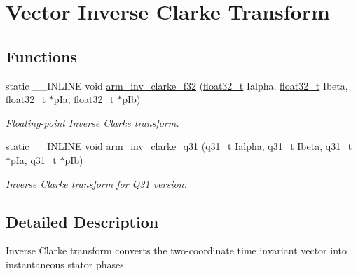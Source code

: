 \hypertarget{group__inv__clarke}{}\section{Vector Inverse Clarke Transform}
\label{group__inv__clarke}
\subsection*{Functions}
\begin{DoxyCompactItemize}
\item 
static \+\_\+\+\_\+\+I\+N\+L\+I\+NE void \hyperlink{group__inv__clarke_ga137f0396d837477b899ecae89f075a50}{arm\+\_\+inv\+\_\+clarke\+\_\+f32} (\hyperlink{arm__math_8h_a4611b605e45ab401f02cab15c5e38715}{float32\+\_\+t} Ialpha, \hyperlink{arm__math_8h_a4611b605e45ab401f02cab15c5e38715}{float32\+\_\+t} Ibeta, \hyperlink{arm__math_8h_a4611b605e45ab401f02cab15c5e38715}{float32\+\_\+t} $\ast$p\+Ia, \hyperlink{arm__math_8h_a4611b605e45ab401f02cab15c5e38715}{float32\+\_\+t} $\ast$p\+Ib)
\begin{DoxyCompactList}\small\item\em Floating-\/point Inverse Clarke transform. \end{DoxyCompactList}\item 
static \+\_\+\+\_\+\+I\+N\+L\+I\+NE void \hyperlink{group__inv__clarke_ga2d0c60f114f095a2f27442d98781ba02}{arm\+\_\+inv\+\_\+clarke\+\_\+q31} (\hyperlink{arm__math_8h_adc89a3547f5324b7b3b95adec3806bc0}{q31\+\_\+t} Ialpha, \hyperlink{arm__math_8h_adc89a3547f5324b7b3b95adec3806bc0}{q31\+\_\+t} Ibeta, \hyperlink{arm__math_8h_adc89a3547f5324b7b3b95adec3806bc0}{q31\+\_\+t} $\ast$p\+Ia, \hyperlink{arm__math_8h_adc89a3547f5324b7b3b95adec3806bc0}{q31\+\_\+t} $\ast$p\+Ib)
\begin{DoxyCompactList}\small\item\em Inverse Clarke transform for Q31 version. \end{DoxyCompactList}\end{DoxyCompactItemize}


\subsection{Detailed Description}
Inverse Clarke transform converts the two-\/coordinate time invariant vector into instantaneous stator phases.

